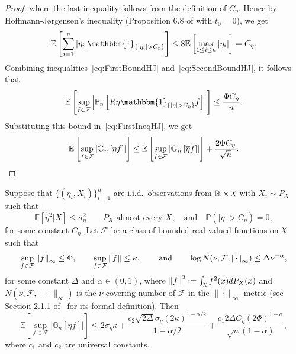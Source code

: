 \begin{proof}
where the last inequality follows from the definition of $C_{\eta}.$ Hence by Hoffmann-J{\o}rgensen's inequality (Proposition 6.8 of \cite{LED91} with $t_0 = 0$), we get
\begin{equation}\label{eq:SecondBoundHJ}
\mathbb{E}\left[\sum_{i=1}^n |\eta_i|\mathbbm{1}_{\{|\eta_i| > C_{\eta}\}}\right] \le 8\mathbb{E}\left[\max_{1\le i\le n}|\eta_i|\right] = C_{\eta}.
\end{equation}
Combining inequalities~\eqref{eq:FirstBoundHJ} and~\eqref{eq:SecondBoundHJ}, it follows that
\[
\mathbb{E}\left[\sup_{f\in\mathcal{F}}\left|\mathbb{P}_n\left[R\eta\mathbbm{1}_{\{|\eta| > C_{\eta}\}} f\right]\right|\right] \le \frac{\Phi C_{\eta}}{n}.
\]
Substituting this bound in~\eqref{eq:FirstIneqHJ}, we get
\[
\mathbb{E}\left[\sup_{f\in\mathcal{F}}\left|\mathbb{G}_n\left[\eta f\right]\right|\right] \le \mathbb{E}\left[\sup_{f\in\mathcal{F}}\left|\mathbb{G}_n\left[\overline{\eta} f\right]\right|\right] + \frac{2\Phi C_{\eta}}{\sqrt{n}}.\qedhere
\]
\end{proof}
\begin{lemma}\label{lem:MixedTailMaximal}
Suppose that $\{(\eta_i,X_i)\}_{i=1}^n$ are i.i.d.~observations from $\R \times \rchi$ with $X_i \sim P_X$ such that 
\begin{equation}\label{eq:eta_cond}
 \mathbb{E}\left[\bar{\eta}^2|X\right] \le \sigma^2_{{\eta}} \qquad P_X \text{ almost every } X, \quad \text{and} \quad \mathbb{P}(|\bar{\eta}| > C_{\eta}) = 0,
\end{equation}
for some constant $C_{\eta}$. Let $\mathcal{F}$ be a class of bounded real-valued functions on $\rchi$ such that
\begin{equation}\label{eq:cond_Lema_chain_1}
\sup_{f\in\mathcal{F}}\left\lVert f\right\rVert_{\infty} \le \Phi,\qquad\sup_{f\in\mathcal{F}}\left\lVert f\right\rVert \le \kappa,\,\qquad\mbox{and}\qquad \log N(\nu, \mathcal{F}, \left\lVert\cdot\right\rVert_{\infty}) \le \Delta\nu^{-\alpha},
\end{equation}
for some constant $\Delta$ and $\alpha \in (0, 1)$, where $\norm{f}^2 := \int_{\rchi} f^2(x)dP_X(x)$ and $N(\nu, \mathcal{F},\|\cdot\|_\infty)$ is the $\nu$-covering number of $\mathcal{F}$ in the $\|\cdot\|_\infty$ metric (see Section 2.1.1 of~\cite{VdVW96} for its formal definition). Then
\begin{equation}\label{eq:Maximal}
\mathbb{E}\left[\sup_{f\in\mathcal{F}}\left|\mathbb{G}_n[\bar{\eta} f]\right|\right] \le 2\sigma_{\eta}\kappa + \frac{c_2\sqrt{2\Delta}\sigma_{\eta}(2\kappa)^{1 - \alpha/2}}{1 - \alpha/2} + \frac{c_1 2\Delta C_{\eta}(2\Phi)^{1 - \alpha}}{\sqrt{n}(1 - \alpha)},
\end{equation}
where $c_1$ and  $c_2$ are universal constants.
\end{lemma}
